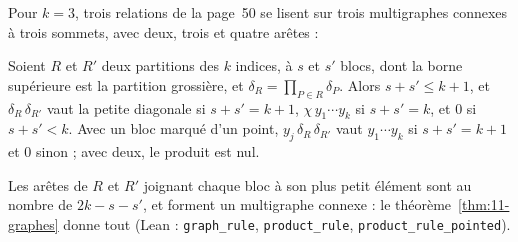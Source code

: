Pour $k = 3$, trois relations de la page~50 se lisent sur trois multigraphes connexes à trois sommets, avec deux, trois et quatre arêtes :
\begin{center}
\end{center}

\begin{corollaire*}
Soient $R$ et $R'$ deux partitions des $k$ indices, à $s$ et $s'$ blocs, dont la borne supérieure est la partition grossière, et $\delta_R = \prod_{P \in R} \delta_P$. Alors $s + s' \leqslant k + 1$, et $\delta_R\,\delta_{R'}$ vaut la petite diagonale si $s + s' = k + 1$, $\chi\, y_1 \cdots y_k$ si $s + s' = k$, et $0$ si $s + s' < k$. Avec un bloc marqué d'un point, $y_j\,\delta_R\,\delta_{R'}$ vaut $y_1 \cdots y_k$ si $s + s' = k + 1$ et $0$ sinon ; avec deux, le produit est nul.
\end{corollaire*}

Les arêtes de $R$ et $R'$ joignant chaque bloc à son plus petit élément sont au nombre de $2k - s - s'$, et forment un multigraphe connexe : le théorème~\ref{thm:11-graphes} donne tout (Lean : \texttt{graph\_rule}, \texttt{product\_rule}, \texttt{product\_rule\_pointed}).

